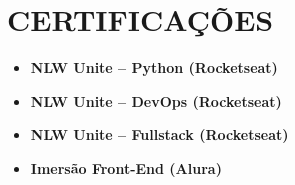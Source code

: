 \section{CERTIFICAÇÕES}
\begin{itemize}
    \item \textbf{NLW Unite – Python (Rocketseat)}
    \item \textbf{NLW Unite – DevOps (Rocketseat)}
    \item \textbf{NLW Unite – Fullstack (Rocketseat)}
    \item \textbf{Imersão Front-End (Alura)}
\end{itemize}
